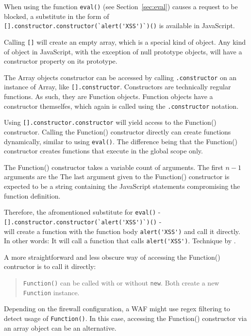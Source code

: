 When using the function \verb|eval()| (see Section~\ref{sec:eval}) causes a request to be blocked, a substitute in the form of \verb|[].constructor.constructor(`alert('XSS')`)()| is available in JavaScript.

Calling \verb|[]| will create an empty array, which is a special kind of object.
Any kind of object in JavaScript, with the exception of null prototype objects, will have a constructor property on its prototype. \cite{js/object}

The Array objects constructor can be accessed by calling \verb|.constructor| on an instance of Array, like \verb|[].constructor|. \cite{js/array}
Constructors are technically regular functions. \cite{js/constructor}
As such, they are Function objects. Function objects have a constructor themselfes, which again is called using the \verb|.constructor| notation.

Using \verb|[].constructor.constructor| will yield access to the Function() constructor.
Calling the Function() constructor directly can create functions dynamically, similar to using \verb|eval()|.
The difference being that the Function() constructor creates functions that execute in the global scope only.

The Function() constructor takes a variable count of arguments. The first $n - 1$ arguments are the  \cite{js/function}
The last argument given to the Function() constructor is expected to be a string containing the JavaScript statements compromising the function definition. \cite{js/function}

Therefore, the afromentioned substitute for \verb|eval()| - \\ \verb|[].constructor.constructor(`alert('XSS')`)()| - \\ will create a function with the function body \verb|alert('XSS')| and call it directly.
In other words: It will call a function that calls \verb|alert('XSS')|.
Technique by \cite{onecons/wafbypass}.

A more straightforward and less obscure way of accessing the Function() contructor is to call it directly:
\begin{quote}
	\verb|Function()| can be called with or without \verb|new|. Both create a new \verb|Function| instance. \cite{js/function}
\end{quote}
Depending on the firewall configuration, a WAF might use regex filtering to detect usage of \verb|Function()|.
In this case, accessing the Function() constructor via an array object can be an alternative.

